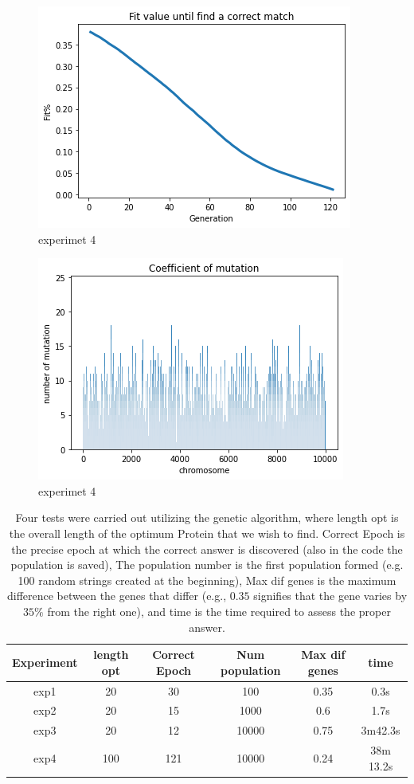 \documentclass[letterpaper]{article} %
\begin{document}
\begin{figure}[h]
\centering
    \includegraphics[scale = 0.5]{fitpop10000v2.png}
    \caption{experimet 4}
\end{figure}
\begin{figure}[h]
 \centering
 \includegraphics[scale = 0.5]{histpop10000v2.png}
 \caption{experimet 4}
\end{figure}

\begin{table}[t]
\centering
\begin{tabular}{|c|c|c|c|c|c|}
        \hline
            Experiment & length opt & Correct Epoch & Num population & Max dif genes & time \\
            \hline
            exp1& 20 & 30 & 100 & 0.35 & 0.3s \\
            exp2& 20 & 15 & 1000 & 0.6 & 1.7s \\
            exp3& 20 & 12 & 10000 & 0.75 & 3m42.3s\\
            exp4& 100 & 121 & 10000 & 0.24 & 38m 13.2s\\
            \hline
    \end{tabular}
    \caption{Four tests were carried out utilizing the genetic algorithm, where length opt is the overall length of the optimum Protein that we wish to find. Correct Epoch is the precise epoch at which the correct answer is discovered (also in the code the population is saved), The population number is the first population formed (e.g. 100 random strings created at the beginning), Max dif genes is the maximum difference between the genes that differ (e.g., $0.35$ signifies that the gene varies by $35\%$ from the right one), and time is the time required to assess the proper answer.}
\end{table}
\end{document}
